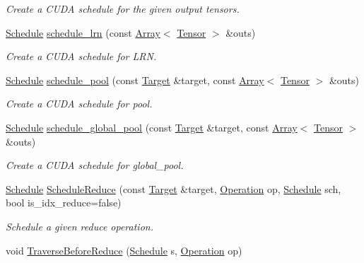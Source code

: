 \begin{DoxyCompactItemize}
\begin{DoxyCompactList}\small\item\em Create a C\+U\+DA schedule for the given output tensors. \end{DoxyCompactList}\item 
\hyperlink{classtvm_1_1te_1_1Schedule}{Schedule} \hyperlink{namespacetopi_1_1cuda_ac33d664c4579676ce9ac5773acc67c19}{schedule\+\_\+lrn} (const \hyperlink{classtvm_1_1Array}{Array}$<$ \hyperlink{classtvm_1_1te_1_1Tensor}{Tensor} $>$ \&outs)
\begin{DoxyCompactList}\small\item\em Create a C\+U\+DA schedule for L\+RN. \end{DoxyCompactList}\item 
\hyperlink{classtvm_1_1te_1_1Schedule}{Schedule} \hyperlink{namespacetopi_1_1cuda_a8f3ae83160a8d6a96b5ddfaca7e1c21b}{schedule\+\_\+pool} (const \hyperlink{classtvm_1_1Target}{Target} \&target, const \hyperlink{classtvm_1_1Array}{Array}$<$ \hyperlink{classtvm_1_1te_1_1Tensor}{Tensor} $>$ \&outs)
\begin{DoxyCompactList}\small\item\em Create a C\+U\+DA schedule for pool. \end{DoxyCompactList}\item 
\hyperlink{classtvm_1_1te_1_1Schedule}{Schedule} \hyperlink{namespacetopi_1_1cuda_ad62dabb52c17a9edcfbeb34cf66b4c4e}{schedule\+\_\+global\+\_\+pool} (const \hyperlink{classtvm_1_1Target}{Target} \&target, const \hyperlink{classtvm_1_1Array}{Array}$<$ \hyperlink{classtvm_1_1te_1_1Tensor}{Tensor} $>$ \&outs)
\begin{DoxyCompactList}\small\item\em Create a C\+U\+DA schedule for global\+\_\+pool. \end{DoxyCompactList}\item 
\hyperlink{classtvm_1_1te_1_1Schedule}{Schedule} \hyperlink{namespacetopi_1_1cuda_a308601fa6af41c20a2864501fd0cda80}{Schedule\+Reduce} (const \hyperlink{classtvm_1_1Target}{Target} \&target, \hyperlink{classtvm_1_1te_1_1Operation}{Operation} op, \hyperlink{classtvm_1_1te_1_1Schedule}{Schedule} sch, bool is\+\_\+idx\+\_\+reduce=false)
\begin{DoxyCompactList}\small\item\em Schedule a given reduce operation. \end{DoxyCompactList}\item 
void \hyperlink{namespacetopi_1_1cuda_a07255e046847302abd54dd2e02a84354}{Traverse\+Before\+Reduce} (\hyperlink{classtvm_1_1te_1_1Schedule}{Schedule} s, \hyperlink{classtvm_1_1te_1_1Operation}{Operation} op)

\end{DoxyCompactItemize}
